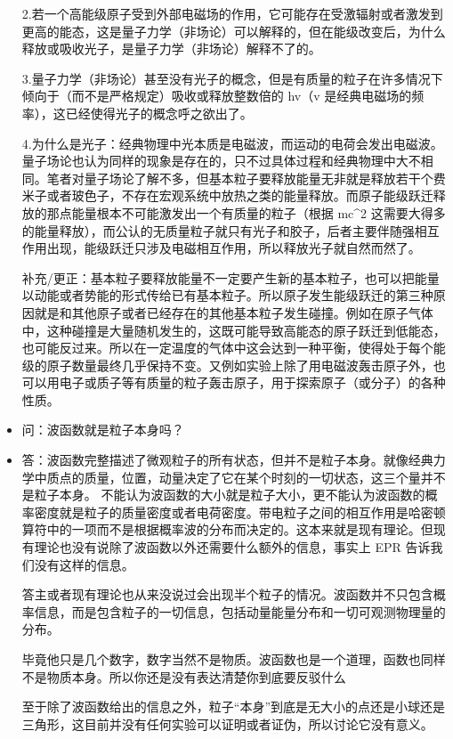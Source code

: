 \begin{itemize}
2.若一个高能级原子受到外部电磁场的作用，它可能存在受激辐射或者激发到更高的能态，这是量子力学（非场论）可以解释的，但在能级改变后，为什么释放或吸收光子，是量子力学（非场论）解释不了的。

3.量子力学（非场论）甚至没有光子的概念，但是有质量的粒子在许多情况下倾向于（而不是严格规定）吸收或释放整数倍的 hv（v 是经典电磁场的频率），这已经使得光子的概念呼之欲出了。

4.为什么是光子：经典物理中光本质是电磁波，而运动的电荷会发出电磁波。量子场论也认为同样的现象是存在的，只不过具体过程和经典物理中大不相同。笔者对量子场论了解不多，但基本粒子要释放能量无非就是释放若干个费米子或者玻色子，不存在宏观系统中放热之类的能量释放。而原子能级跃迁释放的那点能量根本不可能激发出一个有质量的粒子（根据 mc^2 这需要大得多的能量释放），而公认的无质量粒子就只有光子和胶子，后者主要伴随强相互作用出现，能级跃迁只涉及电磁相互作用，所以释放光子就自然而然了。

补充/更正：基本粒子要释放能量不一定要产生新的基本粒子，也可以把能量以动能或者势能的形式传给已有基本粒子。所以原子发生能级跃迁的第三种原因就是和其他原子或者已经存在的其他基本粒子发生碰撞。例如在原子气体中，这种碰撞是大量随机发生的，这既可能导致高能态的原子跃迁到低能态，也可能反过来。所以在一定温度的气体中这会达到一种平衡，使得处于每个能级的原子数量最终几乎保持不变。又例如实验上除了用电磁波轰击原子外，也可以用电子或质子等有质量的粒子轰击原子，用于探索原子（或分子）的各种性质。
\item 问：波函数就是粒子本身吗？
\item 答：波函数完整描述了微观粒子的所有状态，但并不是粒子本身。就像经典力学中质点的质量，位置，动量决定了它在某个时刻的一切状态，这三个量并不是粒子本身。 不能认为波函数的大小就是粒子大小，更不能认为波函数的概率密度就是粒子的质量密度或者电荷密度。带电粒子之间的相互作用是哈密顿算符中的一项而不是根据概率波的分布而决定的。这本来就是现有理论。但现有理论也没有说除了波函数以外还需要什么额外的信息，事实上 EPR 告诉我们没有这样的信息。

答主或者现有理论也从来没说过会出现半个粒子的情况。波函数并不只包含概率信息，而是包含粒子的一切信息，包括动量能量分布和一切可观测物理量的分布。

毕竟他只是几个数字，数字当然不是物质。波函数也是一个道理，函数也同样不是物质本身。所以你还是没有表达清楚你到底要反驳什么

至于除了波函数给出的信息之外，粒子“本身”到底是无大小的点还是小球还是三角形，这目前并没有任何实验可以证明或者证伪，所以讨论它没有意义。
\end{itemize}
